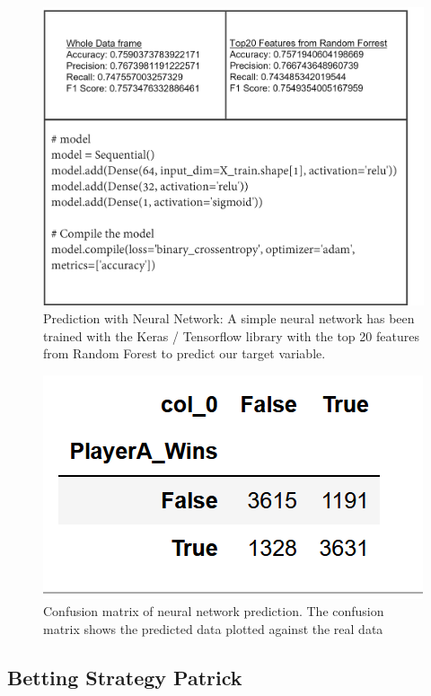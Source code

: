 \documentclass[preprint,aps,nofootinbib,a4paper,superscriptaddress,longbibliography,amsfonts,amssymb,amsmath,titlepage]{revtex4-2}
\begin{document}
%
\begin{figure}[h]
\includegraphics[width=\textwidth]{pictures/nn-model.png}
\caption{Prediction with Neural Network: A simple neural network has been trained with the Keras / Tensorflow library with the top 20 features from Random Forest to predict our target variable.}
\label{nn-moodel}
\end{figure}
%

%
\begin{figure}[h]
\includegraphics[width=\textwidth]{pictures/confusion-matrix-nn.png}
\caption{Confusion matrix of neural network prediction. The confusion matrix shows the predicted data plotted against the real data}
\label{confusion-matrix-nn}
\end{figure}
%

\subsection{Betting Strategy Patrick}
\end{document}
